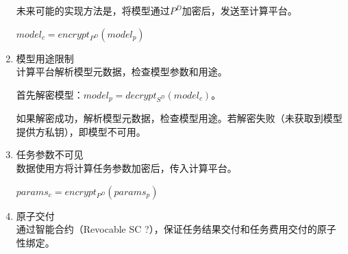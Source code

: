 \begin{enumerate}
    未来可能的实现方法是，将模型通过$P^D$加密后，发送至计算平台。

    $model_c = encrypt_{P^D}(model_p)$

    \item 模型用途限制\\ 
    计算平台解析模型元数据，检查模型参数和用途。

    首先解密模型：$model_p = decrypt_{S^D}(model_c)$。

    如果解密成功，解析模型元数据，检查模型用途。若解密失败（未获取到模型提供方私钥），即模型不可用。

    \item 任务参数不可见\\ 
    数据使用方将计算任务参数加密后，传入计算平台。
    
    $params_c = encrypt_{P^D}(params_p)$
    
    \item 原子交付\\
    通过智能合约（Revocable SC ?），保证任务结果交付和任务费用交付的原子性绑定。


\end{enumerate}

